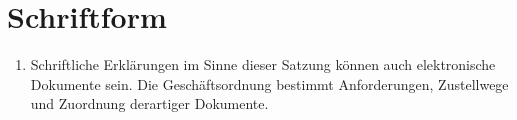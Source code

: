 \documentclass[a4paper,DIV10,12pt,headsepline]{scrartcl}
\begin{document}
\section{Schriftform}
\begin{enumerate}
	\item Schriftliche Erklärungen im Sinne dieser Satzung können auch elektronische Dokumente sein. Die Geschäftsordnung bestimmt Anforderungen, Zustellwege und Zuordnung derartiger Dokumente.
\end{enumerate}
%
%
%  
%  
\end{document}

